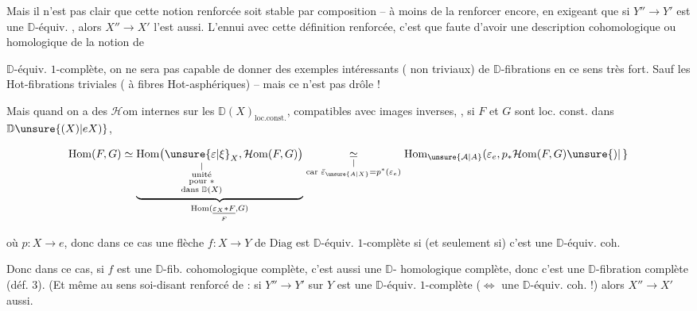 Mais il n'est pas clair que cette notion renforcée soit stable par composition -- à moins de la renforcer encore, en exigeant que si $Y''\to Y'$ est une $\mathbb D$-équiv. , alors $X''\to X'$ l'est aussi. L'ennui avec cette définition renforcée, c'est que faute d'avoir une description cohomologique ou homologique de la notion de



\margin{$\unsure{\ast|\times}$}

$\mathbb D$-équiv. $1$-complète,  on ne sera pas capable de donner des exemples intéressants ( non  triviaux) de $\mathbb D$-fibrations en ce sens très fort. Sauf les Hot-fibrations triviales ( à fibres Hot-asphériques) -- mais ce n'est pas drôle !

Mais quand on a des  $\mathcal H\mathrm{om}$ internes  sur les $\mathbb D(X)_{\mathrm{loc.const.}}$, compatibles avec \margin{$\longrightarrow$}images inverses, , si $F$ et $G$ sont loc.  const. dans $\mathbb D\unsure{(X)|eX)}$,

\[
\mathrm{Hom}(F,G)\simeq
\underbrace{\mathrm{Hom}\bigl(\underset{\substack{\vert\\\text{unité}\\\text{pour }*\\\text{dans }\mathbb D(X)}}{\unsure{\varepsilon|\xi}_X},\mathcal H\mathrm{om}(F,G)\bigr)}
_{\mathrm{Hom}(\underset{F}{\underline{\varepsilon_X*F}},G)}
\underset{\substack{\vert\\\text{car }\bar\varepsilon_{\unsure{A|X}}=p^*(\varepsilon_e)}}{\simeq}
\mathrm{Hom}_{\unsure{\mathcal A|A}}(\varepsilon_e,p_*\mathcal H\mathrm{om}(F,G)\unsure{)|\,}
\]

où $p:X\to e$, donc dans ce cas une flèche $f:X\to Y$ de $\mathrm{Diag}$ est  $\mathbb D$-équiv. $1$-complète si (et seulement si) c'est une $\mathbb D$-équiv. coh.

Donc dans ce cas,  si $f$ est une $\mathbb D$-fib. cohomologique complète, c'est aussi une $\mathbb D$- homologique complète, donc c'est une $\mathbb D$-fibration complète (déf. 3). (Et même au sens soi-disant renforcé de   : si $Y''\to Y'$ sur $Y$ est une $\mathbb D$-équiv. $1$-complète ($\Longleftrightarrow$ une $\mathbb D$-équiv. coh. !) alors $X''\to X'$ aussi.

